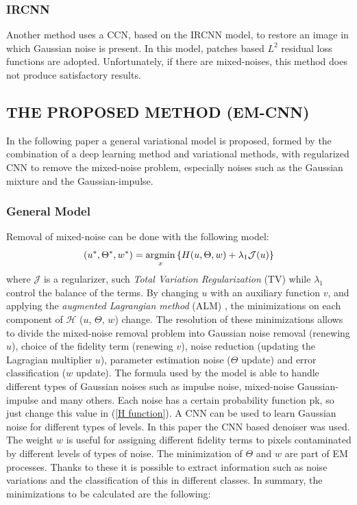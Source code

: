 \subsubsection{IRCNN}
Another method \cite{0884882819} uses a CCN, based on the IRCNN model, to restore an 
image in which Gaussian noise is present. In this model, patches based $ L^2 $ 
residual loss functions are adopted. Unfortunately, if there are mixed-noises, 
this method does not produce satisfactory results.

\subsection{THE PROPOSED METHOD (EM-CNN)}
In the following paper a general variational model is proposed, formed by 
the combination of a deep learning method and variational methods, with 
regularized CNN to remove the mixed-noise problem, especially noises such 
as the Gaussian mixture and the Gaussian-impulse.

\subsubsection{General Model}
Removal of mixed-noise can be done with the following model:
\begin{equation}\label{HFunction}
    (u^*, \Theta^*, w^*) = \operatorname*{argmin}_x\left\{H(u,\Theta,w) + \lambda_1\mathcal{J}(u)\right\}
\end{equation}
where $\mathcal{J}$ is a regularizer, such \emph{Total Variation Regularization} (TV) while $ \lambda_1 $ 
control the balance of the terms. By changing $u$ with an auxiliary function 
$v$, and applying the \emph{augmented Lagrangian method} (ALM) \cite{0884882833}, the minimizations 
on each component of $\mathcal{H}$ ($u$, $\Theta$, $w$) change. The resolution of these 
minimizations allows to divide the mixed-noise removal problem into Gaussian 
noise removal (renewing $u$), choice of the fidelity term (renewing $v$), 
noise reduction (updating the Lagragian multiplier $u$), parameter estimation 
noise ($\Theta$ update) and error classification ($w$ update). The formula used by 
the model is able to handle different types of Gaussian noises such as impulse 
noise, mixed-noise Gaussian-impulse and many others. Each noise has 
a certain probability function pk, so just change this value in (\ref{H function}). A CNN 
can be used to learn Gaussian noise for different types of levels. In this paper 
the CNN based denoiser \cite{0884882819} was used. The weight $w$ is useful for assigning 
different fidelity terms to pixels contaminated by different levels of types of 
noise. The minimization of $\Theta$ and $w$ are part of EM processes. Thanks to 
these it is possible to extract information such as noise variations and the 
classification of this in different classes. In summary, the minimizations to 
be calculated are the following:

